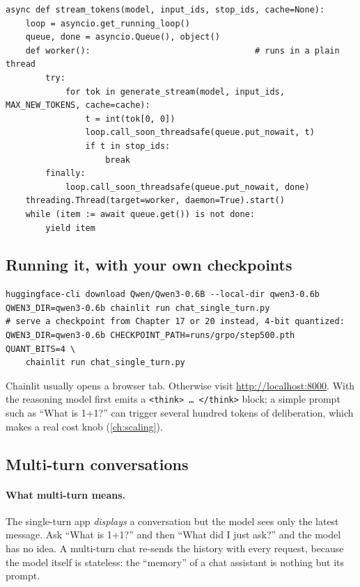 \begin{lstlisting}[caption={Bridging blocking generation and an async web framework.},
label={lst:efficient:stream}]
async def stream_tokens(model, input_ids, stop_ids, cache=None):
    loop = asyncio.get_running_loop()
    queue, done = asyncio.Queue(), object()
    def worker():                                 # runs in a plain thread
        try:
            for tok in generate_stream(model, input_ids, MAX_NEW_TOKENS, cache=cache):
                t = int(tok[0, 0])
                loop.call_soon_threadsafe(queue.put_nowait, t)
                if t in stop_ids:
                    break
        finally:
            loop.call_soon_threadsafe(queue.put_nowait, done)
    threading.Thread(target=worker, daemon=True).start()
    while (item := await queue.get()) is not done:
        yield item
\end{lstlisting}

\subsection{Running it, with your own checkpoints}
\begin{lstlisting}[style=shell]
huggingface-cli download Qwen/Qwen3-0.6B --local-dir qwen3-0.6b
QWEN3_DIR=qwen3-0.6b chainlit run chat_single_turn.py
# serve a checkpoint from Chapter 17 or 20 instead, 4-bit quantized:
QWEN3_DIR=qwen3-0.6b CHECKPOINT_PATH=runs/grpo/step500.pth QUANT_BITS=4 \
    chainlit run chat_single_turn.py
\end{lstlisting}
Chainlit usually opens a browser tab. Otherwise visit \url{http://localhost:8000}. With
\code{THINKING=1} the reasoning model first emits a \texttt{<think>\,\dots\,</think>}
block; a simple prompt such as ``What is 1+1?'' can trigger several hundred tokens of
deliberation, which makes \code{MAX\_NEW\_TOKENS} a real cost knob
(\cref{ch:scaling}).

\subsection{Multi-turn conversations}
\paragraph{What multi-turn means.} The single-turn app \emph{displays} a conversation but
the model sees only the latest message. Ask ``What is 1+1?'' and then ``What did I just
ask?'' and the model has no idea. A multi-turn chat re-sends the history with every
request, because the model itself is stateless: the ``memory'' of a chat assistant is
nothing but its prompt.

